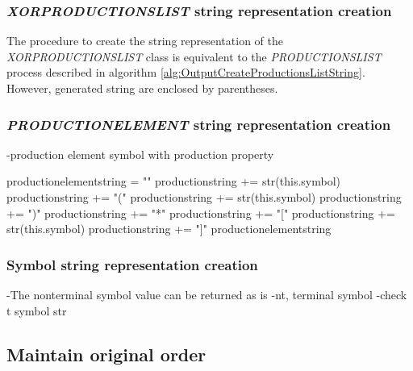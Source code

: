 \subsubsection{\textit{XOR\textunderscore PRODUCTIONS\textunderscore LIST} string representation creation}
The procedure to create the string representation of the \textit{XOR\textunderscore PRODUCTIONS\textunderscore LIST} class is equivalent to the \textit{PRODUCTIONS\textunderscore LIST} process described in algorithm \ref{alg:OutputCreateProductionsListString}. However, generated string are enclosed by parentheses.
\subsubsection{\textit{PRODUCTION\textunderscore ELEMENT} string representation creation}

-production element symbol with production property 

\begin{algorithm}[H]
\caption{\textit{PRODUCTION\textunderscore ELEMENT}  string creation}
\label{alg:OutputCreateProductionElementString}
\begin{algorithmic}[1]
\State production\textunderscore element\textunderscore string = ""
		\State production\textunderscore string += str(this.symbol)
		\State production\textunderscore string += "("
		\State production\textunderscore string += str(this.symbol)
		\State production\textunderscore string += ")"
		\State production\textunderscore string += "*"
		\State production\textunderscore string += "["
		\State production\textunderscore string += str(this.symbol)
		\State production\textunderscore string += "]"
	\EndIf
\State production\textunderscore element\textunderscore string
\end{algorithmic}
\end{algorithm}

\subsubsection{Symbol string representation creation}

-The nonterminal symbol value can be returned as is
-nt, terminal symbol
-check t symbol str

\subsection{Maintain original order}\label{sec:ImplementationOutputGrammarGraphMaintainOrder}

